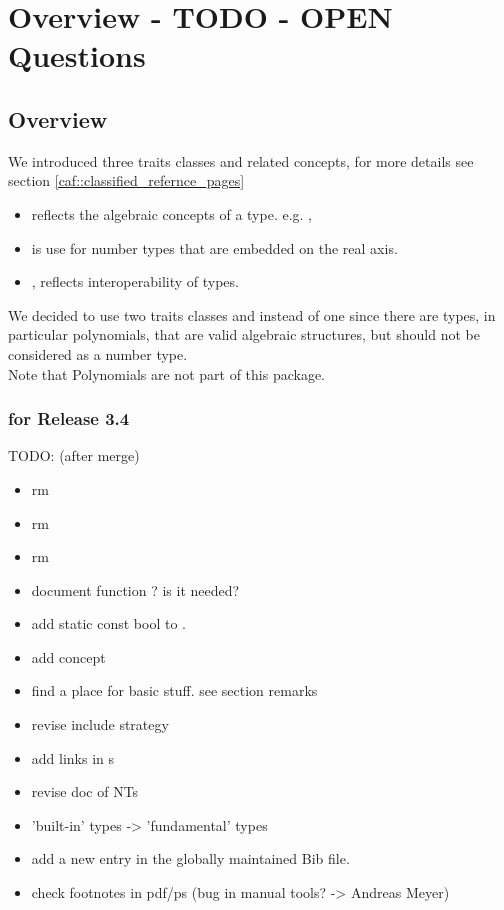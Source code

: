\section{Overview - TODO - OPEN Questions}

\subsection{Overview}

We introduced three traits classes and related concepts, for more details see 
section \ref{caf::classified_refernce_pages}
\begin{itemize}
\item {} reflects the algebraic concepts of a 
      type. e.g. , 
\item {} is use for number types that are embedded on 
      the real axis. 
\item {}, reflects interoperability of types. 
\end{itemize}

We decided to use two traits classes  
and  instead of one  since there are 
types, in particular polynomials, that are valid algebraic structures, 
but should not be considered as a number type.\\
Note that Polynomials are not part of this package. 

\subsubsection{for Release 3.4}

TODO: (after merge) 
\begin{itemize}
\item rm 
\item rm 
\item rm  
\item document function ? is it needed? 
\item add static const bool to   . 
\item add concept 
\item find a place for basic stuff. see section remarks
\item revise include strategy 
\item add links in s
\item revise doc of NTs
\item 'built-in' types -> 'fundamental' types 
\item add a new entry in the globally maintained Bib file.
\item check footnotes in pdf/ps (bug in manual tools? -> Andreas Meyer)
\end{itemize}

